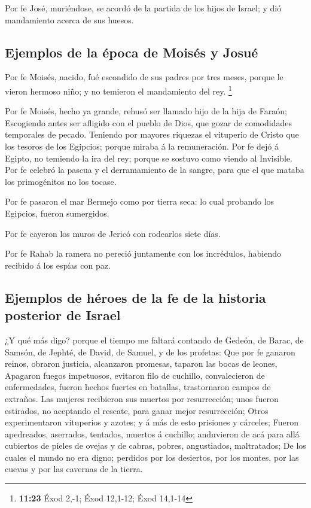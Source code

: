  Por fe José, muriéndose, se acordó de la partida de los
hijos de Israel; y dió mandamiento acerca de sus huesos.

\hypertarget{ejemplos-de-la-uxe9poca-de-moisuxe9s-y-josuuxe9}{%
\subsection{Ejemplos de la época de Moisés y
Josué}\label{ejemplos-de-la-uxe9poca-de-moisuxe9s-y-josuuxe9}}

 Por fe Moisés, nacido, fué escondido de sus padres por
tres meses, porque le vieron hermoso niño; y no temieron el mandamiento
del rey. \footnote{\textbf{11:23} Éxod 2,-1; Éxod 12,1-12; Éxod 14,1-14}

 Por fe Moisés, hecho ya grande, rehusó ser llamado hijo
de la hija de Faraón;  Escogiendo antes ser afligido con
el pueblo de Dios, que gozar de comodidades temporales de pecado.
 Teniendo por mayores riquezas el vituperio de Cristo que
los tesoros de los Egipcios; porque miraba á la remuneración.
 Por fe dejó á Egipto, no temiendo la ira del rey; porque
se sostuvo como viendo al Invisible.  Por fe celebró la
pascua y el derramamiento de la sangre, para que el que mataba los
primogénitos no los tocase.

 Por fe pasaron el mar Bermejo como por tierra seca: lo
cual probando los Egipcios, fueron sumergidos.

 Por fe cayeron los muros de Jericó con rodearlos siete
días.

 Por fe Rahab la ramera no pereció juntamente con los
incrédulos, habiendo recibido á los espías con paz.

\hypertarget{ejemplos-de-huxe9roes-de-la-fe-de-la-historia-posterior-de-israel}{%
\subsection{Ejemplos de héroes de la fe de la historia posterior de
Israel}\label{ejemplos-de-huxe9roes-de-la-fe-de-la-historia-posterior-de-israel}}

 ¿Y qué más digo? porque el tiempo me faltará contando de
Gedeón, de Barac, de Samsón, de Jephté, de David, de Samuel, y de los
profetas:  Que por fe ganaron reinos, obraron justicia,
alcanzaron promesas, taparon las bocas de leones, 
Apagaron fuegos impetuosos, evitaron filo de cuchillo, convalecieron de
enfermedades, fueron hechos fuertes en batallas, trastornaron campos de
extraños.  Las mujeres recibieron sus muertos por
resurrección; unos fueron estirados, no aceptando el rescate, para ganar
mejor resurrección;  Otros experimentaron vituperios y
azotes; y á más de esto prisiones y cárceles;  Fueron
apedreados, aserrados, tentados, muertos á cuchillo; anduvieron de acá
para allá cubiertos de pieles de ovejas y de cabras, pobres,
angustiados, maltratados;  De los cuales el mundo no era
digno; perdidos por los desiertos, por los montes, por las cuevas y por
las cavernas de la tierra.

